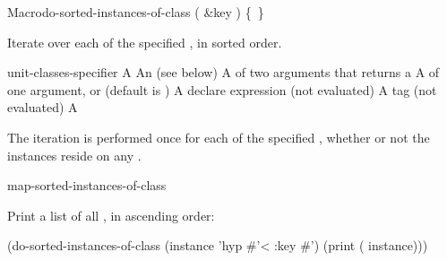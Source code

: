 \documentclass[10pt,twoside,english,pdftex]{article}
\begin{document}
\begin{functiondoc}{Macro}{do-sorted-instances-of-class}%
  {( \&key )
    \mbox{\{ \vbar{} \}\superstar}}
%
%

\fnsyntax

\fnpurpose Iterate over each  of the specified
, in sorted order.

\fnpackage {}

\fnmodule {}

\fnargs
\begin{args}{unit-classes-specifier}
\arg[var] A 
 An 
(see below)
\arg[predicate] A  of two arguments that returns a
\arg[key] A  of one argument, or \nil{} (default is \nil)
\arg[declaration] A declare expression (not evaluated)
\arg[tag] A  tag (not evaluated)
\arg[form] A 
\end{args}

\fndsyntax
\W\supp\tabletop
\unitclassesspec
\subclassingspec

\fndescription The iteration is performed once for each 
of the specified , whether or not the instances reside on
any .

\begin{alsos}{map-sorted-instances-of-class}
\end{alsos}

\fnexample
Print a list of all  , in ascending order:
%
\W\supp
\begin{example}
  (do-sorted-instances-of-class (instance 'hyp #'< :key #')
     (print ( instance)))
\end{example} 

\end{functiondoc}

\end{document}
